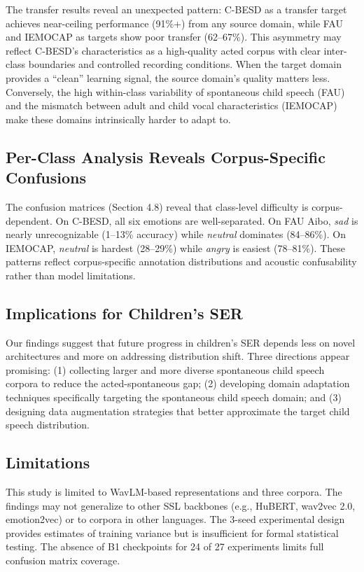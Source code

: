 The transfer results reveal an unexpected pattern: C-BESD as a transfer target achieves near-ceiling performance (91\%+) from any source domain, while FAU and IEMOCAP as targets show poor transfer (62--67\%). This asymmetry may reflect C-BESD's characteristics as a high-quality acted corpus with clear inter-class boundaries and controlled recording conditions. When the target domain provides a ``clean'' learning signal, the source domain's quality matters less. Conversely, the high within-class variability of spontaneous child speech (FAU) and the mismatch between adult and child vocal characteristics (IEMOCAP) make these domains intrinsically harder to adapt to.

\subsection{Per-Class Analysis Reveals Corpus-Specific Confusions}

The confusion matrices (Section 4.8) reveal that class-level difficulty is corpus-dependent. On C-BESD, all six emotions are well-separated. On FAU Aibo, \textit{sad} is nearly unrecognizable (1--13\% accuracy) while \textit{neutral} dominates (84--86\%). On IEMOCAP, \textit{neutral} is hardest (28--29\%) while \textit{angry} is easiest (78--81\%). These patterns reflect corpus-specific annotation distributions and acoustic confusability rather than model limitations.

\subsection{Implications for Children's SER}

Our findings suggest that future progress in children's SER depends less on novel architectures and more on addressing distribution shift. Three directions appear promising: (1) collecting larger and more diverse spontaneous child speech corpora to reduce the acted-spontaneous gap; (2) developing domain adaptation techniques specifically targeting the spontaneous child speech domain; and (3) designing data augmentation strategies that better approximate the target child speech distribution.

\subsection{Limitations}

This study is limited to WavLM-based representations and three corpora. The findings may not generalize to other SSL backbones (e.g., HuBERT, wav2vec 2.0, emotion2vec) or to corpora in other languages. The 3-seed experimental design provides estimates of training variance but is insufficient for formal statistical testing. The absence of B1 checkpoints for 24 of 27 experiments limits full confusion matrix coverage.
